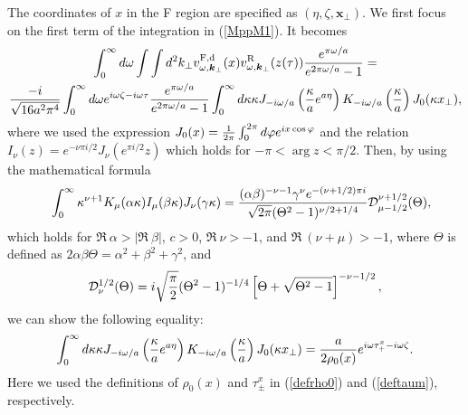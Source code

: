 \documentclass[aps,prd,preprintnumbers,nofootinbib,showpacs,11pt]{revtex4}%
\begin{document}
\begin{widetext}
The coordinates of $x$ in the F region are specified as $(\eta,\zeta,\bm x_\perp)$.
We first focus on the first term of the integration in (\ref{MppM1}). It becomes
\begin{multline}
\int_0^{\infty}d\omega\int\int d^2k_\perp
v_{\omega,\bm k_\perp}^{\rm F,d}(x)v_{\omega,\bm k_\perp}^{\rm R}(z(\tau))
{e^{\pi\omega/a}\over e^{2\pi\omega/a}-1}
=\\
{-i\over \sqrt{16 a^2\pi^4}}\int_0^{\infty}d\omega e^{i\omega\zeta-i\omega\tau}
{e^{\pi\omega/a}\over e^{2\pi\omega/a}-1} \int_0^\infty d\kappa \kappa 
J_{-i\omega/a}\left({\kappa\over a}e^{a\eta}\right)
K_{-i\omega/a}\left({\kappa\over a}\right) J_0(\kappa x_\perp),
\label{firsttermMppM}
\end{multline}
where we used the expression
$J_0(x)={1\over 2\pi} \int_0^{2\pi} d\varphi e^{ix\cos\varphi}$
and the relation
$ I_\nu(z)=e^{-\nu\pi i/2}J_\nu(e^{\pi i/2}z) $ 
which holds for $-\pi<\arg z<\pi/2$. 
Then, by using the mathematical formula
\begin{eqnarray}
&&\int_0^\infty \kappa^{\nu+1}K_\mu(\alpha\kappa)I_\mu(\beta\kappa)J_\nu(\gamma\kappa)
={(\alpha\beta)^{-\nu-1}\gamma^\nu e^{-(\nu+1/2)\pi i}\over \sqrt{2\pi}(\Theta^2-1)^{\nu/2+1/4}}
{\cal D}_{\mu-1/2}^{\nu+1/2}(\Theta) ,
\end{eqnarray}
which holds for $\Re~\alpha>|\Re~\beta|$, $c>0$, $\Re~\nu>-1$, and $\Re~(\nu+\mu)>-1$, where 
$\Theta$ is defined as $2\alpha\beta\Theta=\alpha^2+\beta^2+\gamma^2$, and 
\begin{eqnarray}
{\cal D}_\nu^{1/2}(\Theta)=i\sqrt{\pi\over 2}(\Theta^2-1)^{-1/4}\left[\Theta+\sqrt{\Theta^2-1}\right]^{-\nu-1/2} ,
\end{eqnarray}
 we can show the following equality: 
\begin{eqnarray}
\int_0^\infty d\kappa \kappa J_{-i\omega/a}\left({\kappa\over a}e^{a\eta}\right)
K_{-i\omega/a}\left({\kappa\over a}\right) J_0(\kappa x_\perp)
={a\over 2\rho_0(x)}e^{i\omega\tau_+^{x}-i\omega\zeta}.
\end{eqnarray}
Here we used the definitions of $\rho_0(x)$ and $\tau_\pm^x$ in (\ref{defrho0}) and (\ref{deftaum}), respectively.




\end{widetext}
\end{document}
